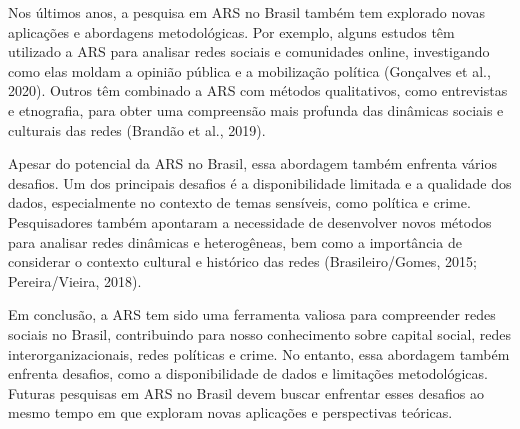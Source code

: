Nos últimos anos, a pesquisa em ARS no Brasil também tem explorado novas aplicações e abordagens metodológicas. Por exemplo, alguns estudos têm utilizado a ARS para analisar redes sociais e comunidades online, investigando como elas moldam a opinião pública e a mobilização política (Gonçalves et al., 2020). Outros têm combinado a ARS com métodos qualitativos, como entrevistas e etnografia, para obter uma compreensão mais profunda das dinâmicas sociais e culturais das redes (Brandão et al., 2019).

Apesar do potencial da ARS no Brasil, essa abordagem também enfrenta vários desafios. Um dos principais desafios é a disponibilidade limitada e a qualidade dos dados, especialmente no contexto de temas sensíveis, como política e crime. Pesquisadores também apontaram a necessidade de desenvolver novos métodos para analisar redes dinâmicas e heterogêneas, bem como a importância de considerar o contexto cultural e histórico das redes (Brasileiro/Gomes, 2015; Pereira/Vieira, 2018).

Em conclusão, a ARS tem sido uma ferramenta valiosa para compreender redes sociais no Brasil, contribuindo para nosso conhecimento sobre capital social, redes interorganizacionais, redes políticas e crime. No entanto, essa abordagem também enfrenta desafios, como a disponibilidade de dados e limitações metodológicas. Futuras pesquisas em ARS no Brasil devem buscar enfrentar esses desafios ao mesmo tempo em que exploram novas aplicações e perspectivas teóricas.